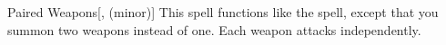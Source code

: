 \lowercase{\hypertarget{spell:Paired Weapons}{}}\label{spell:Paired Weapons}
\begin{apability}[\nth{7}]{\hypertarget{spell:Paired Weapons}{Paired Weapons}}[,  (minor)]
This spell functions like the  spell, except that you summon two weapons instead of one.
Each weapon attacks independently.
\end{apability}
\vspace{0.25em}

